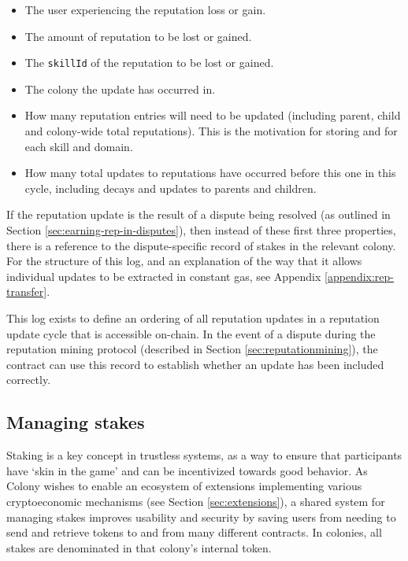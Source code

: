 \begin{itemize}
\item The user experiencing the reputation loss or gain.
\item The amount of reputation to be lost or gained.
\item The \texttt{skillId} of the reputation to be lost or gained.
\item The colony the update has occurred in.
\item How many reputation entries will need to be updated (including parent, child and colony-wide total reputations). This is the motivation for storing  and  for each skill and domain.
\item How many total updates to reputations have occurred before this one in this cycle, including decays and updates to parents and children.
\end{itemize}

If the reputation update is the result of a dispute being resolved (as outlined in Section \ref{sec:earning-rep-in-disputes}), then instead of these first three properties, there is a reference to the dispute-specific record of stakes in the relevant colony. For the structure of this log, and an explanation of the way that it allows individual updates to be extracted in constant gas, see Appendix \ref{appendix:rep-transfer}.

This log exists to define an ordering of all reputation updates in a reputation update cycle that is accessible on-chain. In the event of a dispute during the reputation mining protocol (described in Section \ref{sec:reputationmining}), the  contract can use this record to establish whether an update has been included correctly.

\subsection{Managing stakes}\label{sec:stakes}

Staking is a key concept in trustless systems, as a way to ensure that participants have `skin in the game' and can be incentivized towards good behavior. As Colony wishes to enable an ecosystem of extensions implementing various cryptoeconomic mechanisms (see Section \ref{sec:extensions}), a shared system for managing stakes improves usability and security by saving users from needing to send and retrieve tokens to and from many different contracts. In colonies, all stakes are denominated in that colony's internal token.

